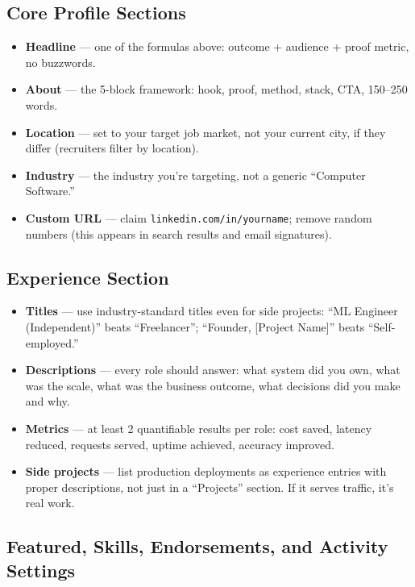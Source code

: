 \subsection{Core Profile Sections}

\begin{itemize}
  \item \textbf{Headline} --- one of the formulas above: outcome + audience + proof metric, no buzzwords.
  \item \textbf{About} --- the 5-block framework: hook, proof, method, stack, CTA, 150--250 words.
  \item \textbf{Location} --- set to your target job market, not your current city, if they differ (recruiters
  filter by location).
  \item \textbf{Industry} --- the industry you're targeting, not a generic ``Computer Software.''
  \item \textbf{Custom URL} --- claim \texttt{linkedin.com/in/yourname}; remove random numbers (this appears in
  search results and email signatures).
\end{itemize}

\subsection{Experience Section}

\begin{itemize}
  \item \textbf{Titles} --- use industry-standard titles even for side projects: ``ML Engineer (Independent)''
  beats ``Freelancer''; ``Founder, [Project Name]'' beats ``Self-employed.''
  \item \textbf{Descriptions} --- every role should answer: what system did you own, what was the scale, what was
  the business outcome, what decisions did you make and why.
  \item \textbf{Metrics} --- at least 2 quantifiable results per role: cost saved, latency reduced, requests
  served, uptime achieved, accuracy improved.
  \item \textbf{Side projects} --- list production deployments as experience entries with proper descriptions, not
  just in a ``Projects'' section. If it serves traffic, it's real work.
\end{itemize}

\subsection{Featured, Skills, Endorsements, and Activity Settings}

